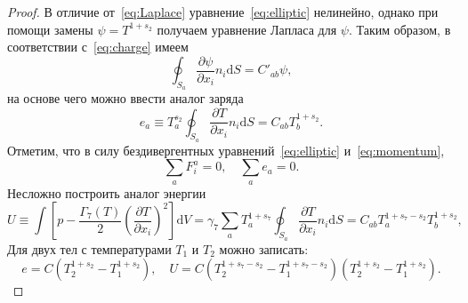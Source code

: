 \documentclass{article}
\theoremstyle{plain}
\newcommand{\dd}{\mathrm{d}}
\newcommand{\pder}[2][]{\frac{\partial#1}{\partial#2}}
\newcommand{\eqdef}{\equiv}
\begin{document}
\begin{proof}

В отличие от~\eqref{eq:Laplace} уравнение~\eqref{eq:elliptic} нелинейно,
однако при помощи замены \(\psi=T^{1+s_2}\) получаем уравнение Лапласа для \(\psi\).
Таким образом, в соответствии с~\eqref{eq:charge} имеем
\begin{equation}\label{eq:charge_linear}
    \oint_{S_a} \pder[\psi]{x_i}n_i\dd{S} = C'_{ab} \psi,
\end{equation}
на основе чего можно ввести аналог заряда
\begin{equation}\label{eq:charge_ell}
    e_a \eqdef T_a^{s_2} \oint_{S_a} \pder[T]{x_i}n_i\dd{S} = C_{ab} T_b^{1+s_2}.
\end{equation}
Отметим, что в силу бездивергентных уравнений~\eqref{eq:elliptic} и~\eqref{eq:momentum},
\begin{equation}\label{eq:closed}
    \sum_a F^a_i = 0, \quad \sum_a e_a = 0.
\end{equation}
Несложно построить аналог энергии
\begin{equation}\label{eq:energy_ell}
    U \eqdef \int \left[ p - \frac{\Gamma_7(T)}2\left(\pder[T]{x_i}\right)^2 \right]\dd{V} =
    \gamma_7 \sum_a T_a^{1+s_7} \oint_{S_a} \pder[T]{x_i}n_i\dd{S} =
    C_{ab} T_a^{1+s_7-s_2} T_b^{1+s_2},
\end{equation}
Для двух тел с температурами \(T_1\) и \(T_2\) можно записать:
\begin{equation}\label{eq:two_bodies}
    e = C \left( T_2^{1+s_2} - T_1^{1+s_2} \right), \quad
    U = C \left( T_2^{1+s_7-s_2} - T_1^{1+s_7-s_2} \right)\left( T_2^{1+s_2} - T_1^{1+s_2} \right).
\end{equation}


\end{proof}
\end{document}
